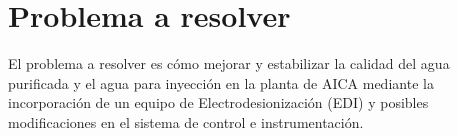 \section*{Problema a resolver}
El problema a resolver es cómo mejorar y estabilizar la calidad del agua purificada y el agua para inyección en la planta de AICA mediante la incorporación de un equipo de Electrodesionización (EDI) y posibles modificaciones en el sistema de control e instrumentación.\\